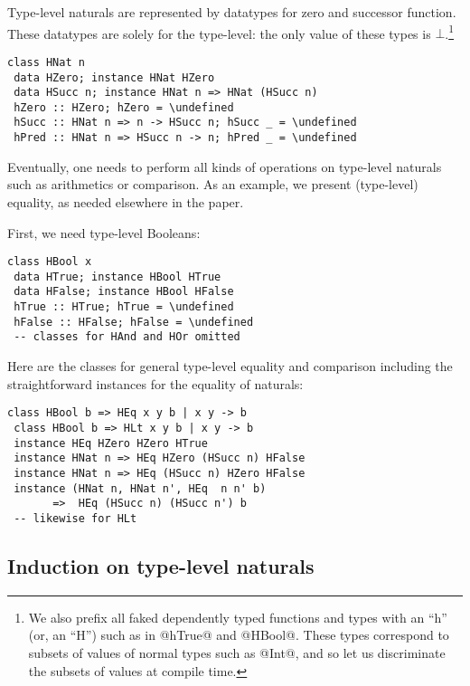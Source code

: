 \documentclass[nocopyrightspace,preprint]{sigplan-proc}
\newcommand{\undefined}{\ensuremath{\bot}}
\begin{document}
Type-level naturals are represented by datatypes for zero and
successor function. These datatypes are solely for the type-level: the
only value of these types is \undefined.\footnote{We also prefix all
faked dependently typed functions and types with an ``h'' (or, an
``H'') such as in @hTrue@ and @HBool@. These types correspond to
subsets of values of normal types such as @Int@, and so let us
discriminate the subsets of values at compile time.}

\begin{Verbatim}[commandchars=\\\{\}]
 class HNat n
 data HZero; instance HNat HZero
 data HSucc n; instance HNat n => HNat (HSucc n)
 hZero :: HZero; hZero = \undefined
 hSucc :: HNat n => n -> HSucc n; hSucc _ = \undefined
 hPred :: HNat n => HSucc n -> n; hPred _ = \undefined
\end{Verbatim}

Eventually, one needs to perform all kinds of operations on type-level
naturals such as arithmetics or comparison. As an example, we present
(type-level) equality, as needed elsewhere in the paper.

First, we need type-level Booleans:

\begin{Verbatim}[commandchars=\\\{\}]
 class HBool x
 data HTrue; instance HBool HTrue
 data HFalse; instance HBool HFalse
 hTrue :: HTrue; hTrue = \undefined
 hFalse :: HFalse; hFalse = \undefined
 -- classes for HAnd and HOr omitted
\end{Verbatim}

Here are the classes for general type-level equality and comparison
including the straightforward instances for the equality of naturals:

\begin{Verbatim}[commandchars=\\\{\}]
 class HBool b => HEq x y b | x y -> b
 class HBool b => HLt x y b | x y -> b
 instance HEq HZero HZero HTrue
 instance HNat n => HEq HZero (HSucc n) HFalse
 instance HNat n => HEq (HSucc n) HZero HFalse
 instance (HNat n, HNat n', HEq  n n' b)
       =>  HEq (HSucc n) (HSucc n') b
 -- likewise for HLt
\end{Verbatim}


\medskip

\subsection*{Induction on type-level naturals}
\end{document}
